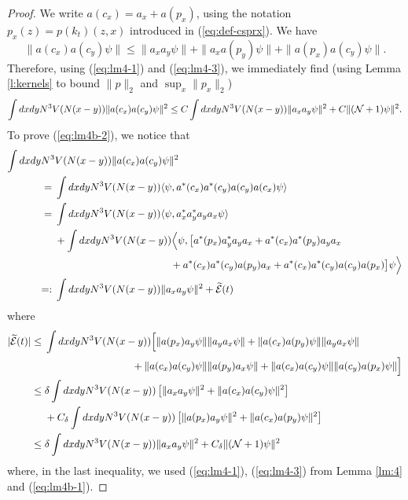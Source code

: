 \documentclass[11pt,a4paper]{article}
\newcommand{\wt}{\widetilde}
\newcommand{\cE}{{\cal E}}
\newcommand{\cN}{{\cal N}}
\begin{document}
\begin{proof}
We write $a (c_x) = a_x + a (p_x)$, using the notation $p_x (z) = p (k_t) (z,x)$ introduced in (\ref{eq:def-csprx}). We have
\[ \| a (c_x) a (c_y) \psi \| \leq \| a_x a_y \psi \| + \| a_x a (p_y) \psi \| + \| a (p_x) a (c_y) \psi \|. \] 
Therefore, using (\ref{eq:lm4-1}) and (\ref{eq:lm4-3}), we immediately find (using Lemma \ref{l:kernels} to bound $\| p \|_2$ and $\sup_x \| p_x \|_2$)
\[ \int dx dy N^3 V(N(x-y)) \| a(c_x) a(c_y) \psi \|^2 \leq C \int dx dy N^3 V (N (x-y)) \| a_x a_y \psi \|^2 + C \| (\cN+1) \psi \|^2. \]
To prove (\ref{eq:lm4b-2}), we notice that
\[ \begin{split} 
\int dx dy N^3 &V (N(x-y)) \| a (c_x) a(c_y) \psi \|^2 \\ = \; & \int dx dy N^3 V (N(x-y)) \langle \psi , a^* (c_x) a^* (c_y) a(c_y) a(c_x) \psi \rangle \\
= \; & \int dx dy N^3 V (N(x-y)) \langle \psi , a^*_x a^*_y a_y a_x \psi \rangle \\
&+\int dx dy N^3 V (N(x-y))  \Big\langle \psi , \big[ a^* (p_x) a^*_y a_y a_x + a^* (c_x) a^* (p_y) a_y a_x \\ &\hspace{4cm} + a^* (c_x) a^* (c_y) a (p_y) a_x + a^* (c_x) a^* (c_y) a (c_y) a(p_x) \big] \psi \Big\rangle \\
=: \; & \int dx dy N^3 V (N (x-y)) \| a_x a_y \psi \|^2 + \wt{\cE} (t) \end{split}\]
where
\[ \begin{split}
|\wt{\cE} (t)| \leq \; & \int dx dy N^3 V(N(x-y)) \Big[ \| a (p_x) a_y \psi \| \| a_y a_x \psi \| + \| a(c_x) a(p_y) \psi \| \| a_y a_x \psi \| \\ &\hspace{3cm} 
+ \| a (c_x) a (c_y) \psi \| \| a(p_y) a_x \psi \| + \| a (c_x) a(c_y) \psi \| \| a(c_y) a(p_x) \psi \| \Big]  \\ \leq\; & \delta \int dx dy N^3 V(N (x-y)) \left[ \| a_x a_y \psi \|^2 + \| a (c_x) a(c_y) \psi \|^2 \right] \\ &+ C_\delta \int dx dy N^3 V(N (x-y)) \left[ \| a(p_x) a_y \psi \|^2 + \| a(c_x) a(p_y) \psi \|^2 \right] 
\\ \leq \; & \delta \int dx dy N^3 V(N (x-y)) \| a_x a_y \psi \|^2 + C_\delta \| (\cN+1) \psi \|^2 \end{split} \]
where, in the last inequality, we used (\ref{eq:lm4-1}), (\ref{eq:lm4-3}) from Lemma \ref{lm:4} and 
(\ref{eq:lm4b-1}).
\end{proof}
\end{document}
